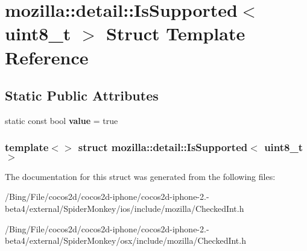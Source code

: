 \hypertarget{structmozilla_1_1detail_1_1_is_supported_3_01uint8__t_01_4}{\section{mozilla\-:\-:detail\-:\-:Is\-Supported$<$ uint8\-\_\-t $>$ Struct Template Reference}
\label{structmozilla_1_1detail_1_1_is_supported_3_01uint8__t_01_4}
}
\subsection*{Static Public Attributes}
\begin{DoxyCompactItemize}
\item 
\hypertarget{structmozilla_1_1detail_1_1_is_supported_3_01uint8__t_01_4_a0fad43c3fdc78cb801c551d093a76630}{static const bool {\bfseries value} = true}\label{structmozilla_1_1detail_1_1_is_supported_3_01uint8__t_01_4_a0fad43c3fdc78cb801c551d093a76630}

\end{DoxyCompactItemize}
\subsubsection*{template$<$$>$ struct mozilla\-::detail\-::\-Is\-Supported$<$ uint8\-\_\-t $>$}



The documentation for this struct was generated from the following files\-:\begin{DoxyCompactItemize}
\item 
/\-Bing/\-File/cocos2d/cocos2d-\/iphone/cocos2d-\/iphone-\/2.-\/beta4/external/\-Spider\-Monkey/ios/include/mozilla/Checked\-Int.\-h\item 
/\-Bing/\-File/cocos2d/cocos2d-\/iphone/cocos2d-\/iphone-\/2.-\/beta4/external/\-Spider\-Monkey/osx/include/mozilla/Checked\-Int.\-h\end{DoxyCompactItemize}
